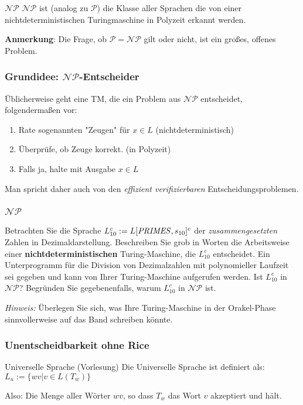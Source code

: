 \documentclass{beamer}
\begin{document}
{\begin{frame}
\begin{block}{$\mathcal{NP}$}
$\mathcal{NP}$ ist (analog zu $\mathcal{P}$) die Klasse aller Sprachen die von einer nichtdeterministischen Turingmaschine in Polyzeit erkannt werden.
\end{block}\vspace{1cm}
\textbf{Anmerkung}: Die Frage, ob $\mathcal{P} = \mathcal{NP}$ gilt oder nicht, ist ein großes, offenes Problem.
\end{frame}

\begin{frame}
\frametitle{Grundidee: $\mathcal{NP}$-Entscheider}
Üblicherweise geht eine TM, die ein Problem aus $\mathcal{NP}$ entscheidet, folgendermaßen vor: 
\begin{enumerate}
\item Rate sogenannten "Zeugen" für $x \in L$ (nichtdeterministisch)
\item Überprüfe, ob Zeuge korrekt. (in Polyzeit)
\item Falls ja, halte mit Ausgabe $x \in L$
\end{enumerate}
Man spricht daher auch von den \emph{effizient verifizierbaren} Entscheidungsproblemen.
\end{frame}

\begin{frame}
\frametitle{$\mathcal{NP}$}
 Betrachten Sie die Sprache $L_{10}^c := L[\text{\textit{PRIMES}},s_{10}]^c$ der \textit{zusammengesetzten} Zahlen in Dezimaldarstellung. 
Beschreiben Sie grob in Worten die Arbeitsweise einer \textbf{nichtdeterministischen} Turing-Maschine, die $L_{10}^c$ entscheidet. 
Ein Unterprogramm für die Division von Dezimalzahlen mit polynomieller Laufzeit sei gegeben und kann von Ihrer Turing-Maschine aufgerufen werden. 
Ist $L_{10}^c$ in $\mathcal{NP}$? Begründen Sie gegebenenfalls, warum $L_{10}^c$ in $\mathcal{NP}$ ist.

\medskip
\textit{Hinweis:} Überlegen Sie sich, was Ihre Turing-Maschine in der Orakel-Phase sinnvollerweise auf das Band schreiben könnte.
\end{frame}


\begin{frame}
\frametitle{Unentscheidbarkeit ohne Rice}
\begin{block}{Universelle Sprache (Vorlesung)}
Die Universelle Sprache ist definiert als: $L_u := \{wv | v \in L(T_w)\}$
\end{block}
Also: Die Menge aller Wörter $wv$, so dass $T_w$ das Wort $v$ akzeptiert und hält.
\end{frame}

}
\end{document}
